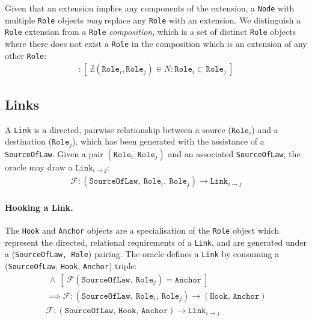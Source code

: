 \documentclass{article}
\numberwithin{equation}{section}
\begin{document}
Given that an extension implies any components of the extension, a \texttt{Node} with multiple \texttt{Role} objects \textit{may} replace any \texttt{Role} with an extension. We distinguish a \texttt{Role} extension from a \texttt{Role} \textit{composition}, which is a set of distinct \texttt{Role} objects where there does not exist a \texttt{Role} in the composition which is an extension of any other \texttt{Role}:
\begin{align}
	[ \ N := \ \{ \ \texttt{Role}_0, .., \texttt{Role}_n \ \} \ ] : [ \ \nexists (\texttt{Role}_i, \texttt{Role}_j) \in N : \texttt{Role}_i \subset \texttt{Role}_j \ ]
\end{align}



\subsection{Links}\label{section:links}

A \texttt{Link} is a directed, pairwise relationship between a source ($\texttt{Role}_i$) and a destination ($\texttt{Role}_j$), which has been generated with the assistance of a \texttt{SourceOfLaw}. Given a pair $(\texttt{Role}_i, \texttt{Role}_j)$ and an associated \texttt{SourceOfLaw}, the oracle may draw a $\texttt{Link}_{i \rightarrow j}$:
\begin{align}
	\mathcal{F} : (\texttt{SourceOfLaw}, \ \texttt{Role}_i, \ \texttt{Role}_j) \rightarrow  \texttt{Link}_{i \rightarrow j}
\end{align}

\paragraph{Hooking a Link.} The \texttt{Hook} and \texttt{Anchor} objects are a specialisation of the \texttt{Role} object which represent the directed, relational requirements of a \texttt{Link}, and are generated under a (\texttt{SourceOfLaw, Role}) pairing. The oracle defines a \texttt{Link} by consuming a (\texttt{SourceOfLaw}, \texttt{Hook}, \texttt{Anchor}) triple:
\begin{align}
	[ \ \mathcal{F}(\texttt{SourceOfLaw}, \ \texttt{Role}_i) = \texttt{Hook} \ ] \ \land \ [ \ \mathcal{F}(\texttt{SourceOfLaw}, \ \texttt{Role}_j) = \texttt{Anchor} \ ] \\
	\implies \mathcal{F}: (\texttt{SourceOfLaw}, \ \texttt{Role}_i, \ \texttt{Role}_j) \rightarrow (\texttt{Hook, Anchor}) \\ 
	\mathcal{F} : (\texttt{SourceOfLaw, Hook, Anchor}) \rightarrow \texttt{Link}_{i \rightarrow j}
\end{align}
\end{document}
